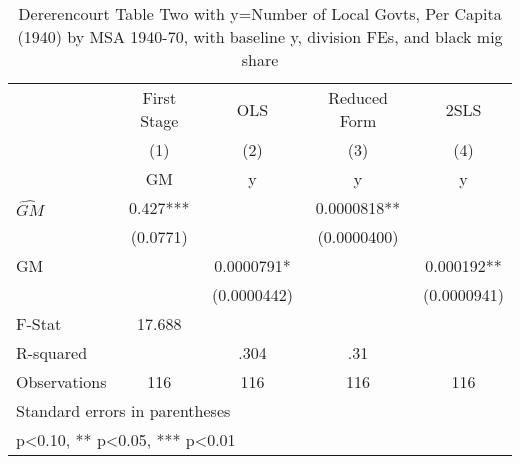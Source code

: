 \begin{table}[htbp]\centering
\def\sym#1{\ifmmode^{#1}\else\(^{#1}\)\fi}
\caption{Dererencourt Table Two with y=Number of Local Govts, Per Capita (1940) by MSA 1940-70, with baseline y, division FEs, and black mig share}
\begin{tabular}{l*{4}{c}}
\toprule
                    & First Stage   &         OLS   &Reduced Form   &        2SLS   \\
                    &\multicolumn{1}{c}{(1)}&\multicolumn{1}{c}{(2)}&\multicolumn{1}{c}{(3)}&\multicolumn{1}{c}{(4)}\\
                    &\multicolumn{1}{c}{GM}&\multicolumn{1}{c}{y}&\multicolumn{1}{c}{y}&\multicolumn{1}{c}{y}\\
\midrule
$\hat{GM}$          &       0.427***&               &   0.0000818** &               \\
                    &    (0.0771)   &               & (0.0000400)   &               \\
\addlinespace
GM                  &               &   0.0000791*  &               &    0.000192** \\
                    &               & (0.0000442)   &               & (0.0000941)   \\
\midrule
F-Stat              &      17.688   &               &               &               \\
R-squared           &               &        .304   &         .31   &               \\
Observations        &         116   &         116   &         116   &         116   \\
\bottomrule
\multicolumn{5}{l}{\footnotesize Standard errors in parentheses}\\
\multicolumn{5}{l}{\footnotesize * p<0.10, ** p<0.05, *** p<0.01}\\
\end{tabular}
\end{table}
